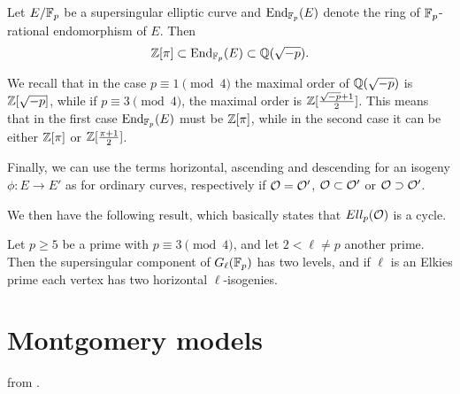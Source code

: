 \begin{proposition}
    Let $E/\mathbb{F}_p$ be a supersingular elliptic curve and $\operatorname{End}_{\mathbb{F}_p}(E)$ denote the ring of $\mathbb{F}_p$-rational endomorphism of $E$. Then $$\mathbb{Z}[\pi]\subset \operatorname{End}_{\mathbb{F}_p}(E) \subset \mathbb{Q}(\sqrt{-p}).$$
\end{proposition}

We recall that in the case $p\equiv1\pmod 4$ the maximal order of $\mathbb{Q}(\sqrt{-p})$ is $\mathbb{Z}[\sqrt{-p}]$, while if $p\equiv 3\pmod 4$, the maximal order is $\mathbb{Z}[\frac{\sqrt{-p}+1}{2}]$. This means that in the first case $\operatorname{End}_{\mathbb{F}_p}(E)$ must be $\mathbb{Z}[\pi]$, while in the second case it can be either $\mathbb{Z}[\pi]$ or $\mathbb{Z}[\frac{\pi+1}{2}]$.

Finally, we can use the terms horizontal, ascending and descending for an isogeny $\phi:E\to E'$ as for ordinary curves, respectively if $\mathcal{O}=\mathcal{O}'$, $\mathcal{O}\subset\mathcal{O}'$ or $\mathcal{O}\supset\mathcal{O}'$.

We then have the following result, which basically states that $Ell_p(\mathcal{O})$ is a cycle. 

\begin{theorem}\label{CSIDH_cycle}
    Let $p\ge 5$ be a prime with $p\equiv3\pmod{4}$, and let $2<\ell\neq p$ another prime. Then the supersingular component of $G_\ell(\mathbb{F}_p)$ has two levels, and if $\ell$ is an Elkies prime each vertex has two horizontal $\ell$-isogenies.
\end{theorem}



\section{Montgomery models}
\cite{Costello_Montgomery} from \cite{Montgomery_curve}.

